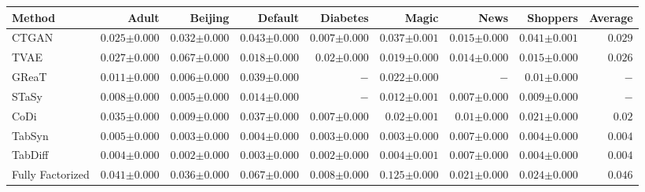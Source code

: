 \begin{tabular}{lrrrrrrr|r}
    \toprule[0.8pt]
     \textbf{Method} & \textbf{Adult} & \textbf{Beijing} & \textbf{Default} & \textbf{Diabetes} & \textbf{Magic} & \textbf{News} & \textbf{Shoppers} & \textbf{Average} \\
    \midrule 
    CTGAN & $0.025${\tiny${\pm 0.000}$} & $0.032${\tiny${\pm 0.000}$} & $0.043${\tiny${\pm 0.000}$} & $0.007${\tiny${\pm 0.000}$} & $0.037${\tiny${\pm 0.001}$} & $0.015${\tiny${\pm 0.000}$} & $0.041${\tiny${\pm 0.001}$} & $0.029$ \\
    TVAE & $0.027${\tiny${\pm 0.000}$} & $0.067${\tiny${\pm 0.000}$} & $0.018${\tiny${\pm 0.000}$} & $0.02${\tiny${\pm 0.000}$} & $0.019${\tiny${\pm 0.000}$} & $0.014${\tiny${\pm 0.000}$} & $0.015${\tiny${\pm 0.000}$} & $0.026$ \\
    GReaT & $0.011${\tiny${\pm 0.000}$} & $0.006${\tiny${\pm 0.000}$} & $0.039${\tiny${\pm 0.000}$} & $-$ & $0.022${\tiny${\pm 0.000}$} & $-$ & $0.01${\tiny${\pm 0.000}$} & $-$ \\
    STaSy & $0.008${\tiny${\pm 0.000}$} & $0.005${\tiny${\pm 0.000}$} & $0.014${\tiny${\pm 0.000}$} & $-$ & $0.012${\tiny${\pm 0.001}$} & $0.007${\tiny${\pm 0.000}$} & $0.009${\tiny${\pm 0.000}$} & $-$ \\
    CoDi & $0.035${\tiny${\pm 0.000}$} & $0.009${\tiny${\pm 0.000}$} & $0.037${\tiny${\pm 0.000}$} & $0.007${\tiny${\pm 0.000}$} & $0.02${\tiny${\pm 0.001}$} & $0.01${\tiny${\pm 0.000}$} & $0.021${\tiny${\pm 0.000}$} & $0.02$ \\
    TabSyn & $0.005${\tiny${\pm 0.000}$} & $0.003${\tiny${\pm 0.000}$} & $0.004${\tiny${\pm 0.000}$} & $0.003${\tiny${\pm 0.000}$} & $0.003${\tiny${\pm 0.000}$} & $0.007${\tiny${\pm 0.000}$} & $0.004${\tiny${\pm 0.000}$} & $0.004$ \\
    TabDiff & $0.004${\tiny${\pm 0.000}$} & $0.002${\tiny${\pm 0.000}$} & $0.003${\tiny${\pm 0.000}$} & $0.002${\tiny${\pm 0.000}$} & $0.004${\tiny${\pm 0.001}$} & $0.007${\tiny${\pm 0.000}$} & $0.004${\tiny${\pm 0.000}$} & $0.004$ \\
    \midrule
    Fully Factorized & $0.041${\tiny${\pm 0.000}$} & $0.036${\tiny${\pm 0.000}$} & $0.067${\tiny${\pm 0.000}$} & $0.008${\tiny${\pm 0.000}$} & $0.125${\tiny${\pm 0.000}$} & $0.021${\tiny${\pm 0.000}$} & $0.024${\tiny${\pm 0.000}$} & $0.046$ \\

\end{tabular}

